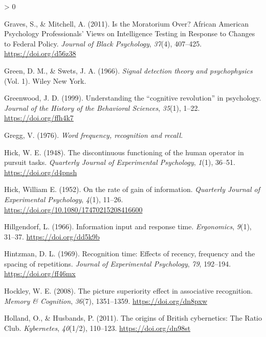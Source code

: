 \documentclass[
  oneside,
  12pt]{crumpbook}
\newlength{\cslhangindent}
\newenvironment{CSLReferences}[2] %
 {%
  \setlength{\parindent}{0pt}
  \ifodd #1 \everypar{\setlength{\hangindent}{\cslhangindent}}\ignorespaces\fi
  \ifnum #2 > 0
  \setlength{\parskip}{#2\baselineskip}
  \fi
 }%
 {}
\begin{document}
\begin{CSLReferences}{1}{0}
\leavevmode\hypertarget{ref-gravesMoratoriumAfricanAmerican2011}{}%
Graves, S., \& Mitchell, A. (2011). Is the {Moratorium Over}? {African American Psychology Professionals}' {Views} on {Intelligence Testing} in {Response} to {Changes} to {Federal Policy}. \emph{Journal of Black Psychology}, \emph{37}(4), 407--425. \url{https://doi.org/d56z38}

\leavevmode\hypertarget{ref-greenSignalDetectionTheory1966}{}%
Green, D. M., \& Swets, J. A. (1966). \emph{Signal detection theory and psychophysics} (Vol. 1). {Wiley New York}.

\leavevmode\hypertarget{ref-greenwoodUnderstandingCognitiveRevolution1999}{}%
Greenwood, J. D. (1999). Understanding the {``cognitive revolution''} in psychology. \emph{Journal of the History of the Behavioral Sciences}, \emph{35}(1), 1--22. \url{https://doi.org/ffh4k7}

\leavevmode\hypertarget{ref-greggWordFrequencyRecognition1976}{}%
Gregg, V. (1976). \emph{Word frequency, recognition and recall.}

\leavevmode\hypertarget{ref-hickDiscontinuousFunctioningHuman1948}{}%
Hick, W. E. (1948). The discontinuous functioning of the human operator in pursuit tasks. \emph{Quarterly Journal of Experimental Psychology}, \emph{1}(1), 36--51. \url{https://doi.org/d4pnsh}

\leavevmode\hypertarget{ref-hickRateGainInformation1952}{}%
Hick, William E. (1952). On the rate of gain of information. \emph{Quarterly Journal of Experimental Psychology}, \emph{4}(1), 11--26. \url{https://doi.org/10.1080/17470215208416600}

\leavevmode\hypertarget{ref-hillgendorfInformationInputResponse1966}{}%
Hillgendorf, L. (1966). Information input and response time. \emph{Ergonomics}, \emph{9}(1), 31--37. \url{https://doi.org/dd5k9b}

\leavevmode\hypertarget{ref-hintzmanRecognitionTimeEffects1969}{}%
Hintzman, D. L. (1969). Recognition time: {Effects} of recency, frequency and the spacing of repetitions. \emph{Journal of Experimental Psychology}, \emph{79}, 192--194. \url{https://doi.org/ff46mx}

\leavevmode\hypertarget{ref-hockleyPictureSuperiorityEffect2008}{}%
Hockley, W. E. (2008). The picture superiority effect in associative recognition. \emph{Memory \& Cognition}, \emph{36}(7), 1351--1359. \url{https://doi.org/dn8pxw}

\leavevmode\hypertarget{ref-hollandOriginsBritishCybernetics2011}{}%
Holland, O., \& Husbands, P. (2011). The origins of {British} cybernetics: The {Ratio Club}. \emph{Kybernetes}, \emph{40}(1/2), 110--123. \url{https://doi.org/dn98st}


\end{CSLReferences}
\end{document}
